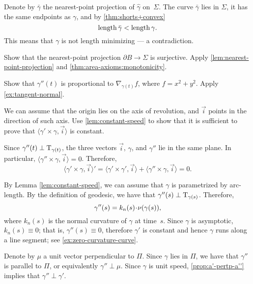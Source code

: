 \begin{multicols}{2}
Denote by $\bar\gamma$ the nearest-point projection of $\hat\gamma$ on~$\Sigma$.
The curve $\bar\gamma$ lies in $\Sigma$, 
it has the same endpoints as $\gamma$,
and by \ref{thm:shorts+convex}
\[\mathop{\rm length}\nolimits\bar\gamma<\mathop{\rm length}\nolimits\gamma.\]
This means that $\gamma$ is not length minimizing --- 
a contradiction.

Show that the nearest-point projection $\partial B\to\Sigma$ is surjective.
Apply \ref{lem:nearest-point-projection} and \ref{thm:area-axioms:monotonicity}.


\setcounter{eqtn}{0}

 Show that $\gamma''(t)$ is proportional to $\nabla_{\gamma(t)} f$, where $f=x^2+y^2$. 
Apply \ref{ex:tangent-normal}.

We can assume that the origin lies on the axis of revolution, and $\vec i$ points in the direction of such axis.
Use \ref{lem:constant-speed} to show that it is sufficient to prove that 
$\langle\gamma'\times \gamma,\vec i\rangle$
is constant.

Since $\gamma''(t)\perp\mathrm{T}_{\gamma(t)}$, the three vectors $\vec i$, $\gamma$, and $\gamma''$ lie in the same plane.
In particular, $\langle\gamma''\times \gamma,\vec i\rangle=0$.
Therefore,
\[
\langle\gamma'\times \gamma,\vec i\rangle'
=
\langle\gamma'\times \gamma',\vec i\rangle+\langle\gamma''\times \gamma,\vec i\rangle =0
.\]



 By Lemma \ref{lem:constant-speed},
we can assume that $\gamma$ is parametrized by arc-length.
By the definition of geodesic, we have that $\gamma''(s)\perp\mathrm{T}_{\gamma(s)}$. 
Therefore, 
\[\gamma''(s)=k_n(s)\cdot\Norm(\gamma(s)),\]
where $k_n(s)$ is the normal curvature of $\gamma$ at time~$s$.
Since $\gamma$ is asymptotic, $k_n(s)\equiv 0$;
that is, $\gamma''(s)\equiv 0$, therefore $\gamma'$ is constant and hence $\gamma$ runs along a line segment; see \ref{ex:zero-curvature-curve}.




Denote by $\mu$ a unit vector perpendicular to $\Pi$.
Since $\gamma$ lies in $\Pi$, we have that $\gamma''$ is parallel to $\Pi$, or equivalently $\gamma''\perp \mu$.
Since $\gamma$ is unit speed, \ref{prop:a'-pertp-a''} implies that $\gamma''\perp\gamma'$.


\end{multicols}
